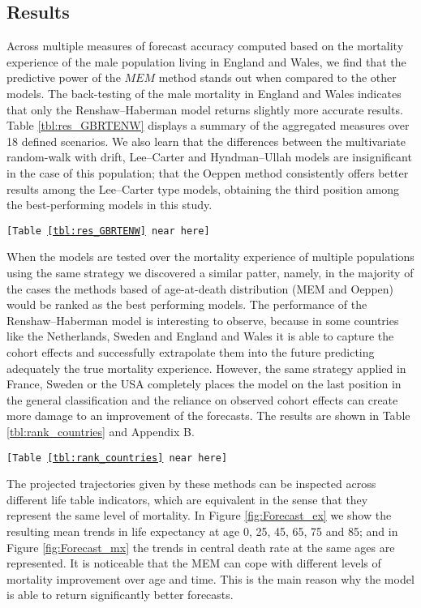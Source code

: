 \documentclass[T0_MEM]{subfiles}
\begin{document}
\subsection{Results}\label{sec:res}

Across multiple measures of forecast accuracy computed based on the mortality experience of the male population living in England and Wales, we find that the predictive power of the $MEM$ method stands out when compared to the other models. The back-testing of the male mortality in England and Wales indicates that only the Renshaw--Haberman model returns slightly more accurate results. Table \ref{tbl:res_GBRTENW} displays a summary of the aggregated measures over 18 defined scenarios. We also learn that the differences between the multivariate random-walk with drift, Lee--Carter and Hyndman--Ullah models are insignificant in the case of this population; that the Oeppen method consistently offers better results among the Lee--Carter type models, obtaining the third position among the best-performing models in this study.

\begin{center}\texttt{[Table \ref{tbl:res_GBRTENW} near here]}\end{center}

When the models are tested over the mortality experience of multiple populations using the same strategy we discovered a similar patter, namely, in the majority of the cases the methods based of age-at-death distribution (MEM and Oeppen) would be ranked as the best performing models. The performance of the Renshaw--Haberman model is interesting to observe, because in some countries like the Netherlands, Sweden and England and Wales it is able to capture the cohort effects and successfully extrapolate them into the future predicting adequately the true mortality experience. However, the same strategy applied in France, Sweden or the USA completely places the model on the last position in the general classification and the reliance on observed cohort effects can create more damage to an improvement of the forecasts. The results are shown in Table \ref{tbl:rank_countries} and Appendix B.

\begin{center}\texttt{[Table \ref{tbl:rank_countries} near here]}\end{center}

The projected trajectories given by these methods can be inspected across different life table indicators, which are equivalent in the sense that they represent the same level of mortality. In Figure \ref{fig:Forecast_ex} we show the resulting mean trends in life expectancy at age 0, 25, 45, 65, 75 and 85; and in Figure \ref{fig:Forecast_mx} the trends in central death rate at the same ages are represented. It is noticeable that the MEM can cope with different levels of mortality improvement over age and time. This is the main reason why the model is able to return significantly better forecasts.
\end{document}

